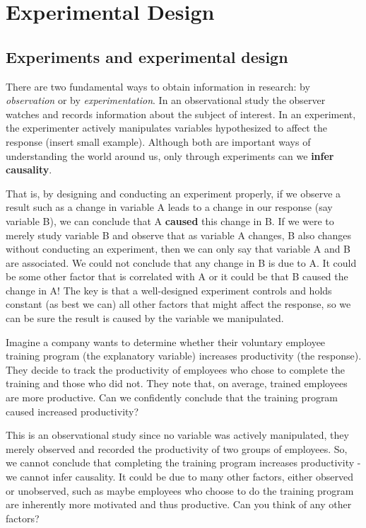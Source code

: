 \documentclass[
  letterpaper,
]{book}
\begin{document}
\part{Experimental Design}

\chapter{Experiments and experimental
design}\label{experiments-and-experimental-design}

There are two fundamental ways to obtain information in research: by
\emph{observation} or by \emph{experimentation}. In an observational
study the observer watches and records information about the subject of
interest. In an experiment, the experimenter actively manipulates
variables hypothesized to affect the response (insert small example).
Although both are important ways of understanding the world around us,
only through experiments can we \textbf{infer causality}.

That is, by designing and conducting an experiment properly, if we
observe a result such as a change in variable A leads to a change in our
response (say variable B), we can conclude that A \textbf{caused} this
change in B. If we were to merely study variable B and observe that as
variable A changes, B also changes without conducting an experiment,
then we can only say that variable A and B are associated. We could not
conclude that any change in B is due to A. It could be some other factor
that is correlated with A or it could be that B caused the change in A!
The key is that a well-designed experiment controls and holds constant
(as best we can) all other factors that might affect the response, so we
can be sure the result is caused by the variable we manipulated.

Imagine a company wants to determine whether their voluntary employee
training program (the explanatory variable) increases productivity (the
response). They decide to track the productivity of employees who chose
to complete the training and those who did not. They note that, on
average, trained employees are more productive. Can we confidently
conclude that the training program caused increased productivity?

This is an observational study since no variable was actively
manipulated, they merely observed and recorded the productivity of two
groups of employees. So, we cannot conclude that completing the training
program increases productivity - we cannot infer causality. It could be
due to many other factors, either observed or unobserved, such as maybe
employees who choose to do the training program are inherently more
motivated and thus productive. Can you think of any other factors?
\end{document}
